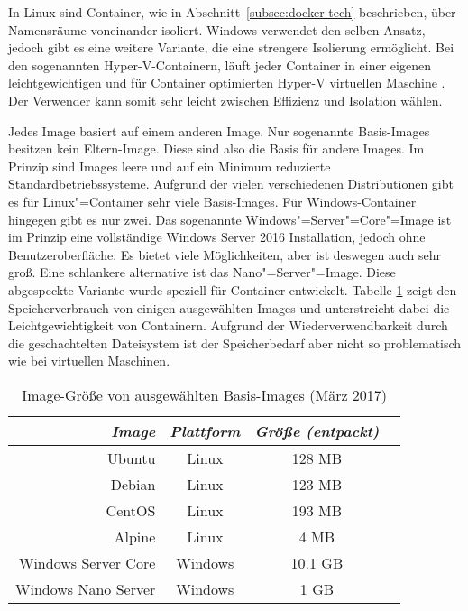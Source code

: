 In Linux sind Container, wie in Abschnitt~\ref{subsec:docker-tech} beschrieben, über Namensräume voneinander isoliert. Windows verwendet den selben Ansatz, jedoch gibt es eine weitere Variante, die eine strengere Isolierung ermöglicht. Bei den sogenannten Hyper-V-Containern, läuft jeder Container in einer eigenen leichtgewichtigen und für Container optimierten Hyper-V virtuellen Maschine \cite{WinConHyperV}. Der Verwender kann somit sehr leicht zwischen Effizienz und Isolation wählen.

Jedes Image basiert auf einem anderen Image. Nur sogenannte Basis-Images besitzen kein Eltern-Image. Diese sind also die Basis für andere Images. Im Prinzip sind Images leere und auf ein Minimum reduzierte Standardbetriebssysteme. Aufgrund der vielen verschiedenen Distributionen gibt es für Linux"=Container sehr viele Basis-Images. Für Windows-Container hingegen gibt es nur zwei. Das sogenannte Windows"=Server"=Core"=Image ist im Prinzip eine vollständige Windows Server 2016 Installation, jedoch ohne Benutzeroberfläche. Es bietet viele Möglichkeiten, aber ist deswegen auch sehr groß. Eine schlankere alternative ist das Nano"=Server"=Image. Diese abgespeckte Variante wurde speziell für Container entwickelt. Tabelle \ref{tab:docker-image-size} zeigt den Speicherverbrauch von einigen ausgewählten Images und unterstreicht dabei die Leichtgewichtigkeit von Containern. Aufgrund der Wiederverwendbarkeit durch die geschachtelten Dateisystem ist der Speicherbedarf aber nicht so problematisch wie bei virtuellen Maschinen.

\begin{table}[!hbt]
\caption{Image-Größe von ausgewählten Basis-Images (März 2017)}
\label{tab:docker-image-size}
\centering
\setlength{\tabcolsep}{5mm} %
\def\arraystretch{1.25} %
\begin{tabular}{|r||c|c|c|}
\hline
\emph{Image} & \emph{Plattform} & \emph{Größe (entpackt)} \\
\hline
\hline
Ubuntu & Linux & 128 MB \\
\hline
Debian & Linux & 123 MB \\
\hline
CentOS & Linux & 193 MB \\
\hline
Alpine & Linux & 4 MB \\
\hline
Windows Server Core & Windows & 10.1 GB \\
\hline
Windows Nano Server & Windows & 1 GB \\
\hline
\end{tabular}
\end{table}

